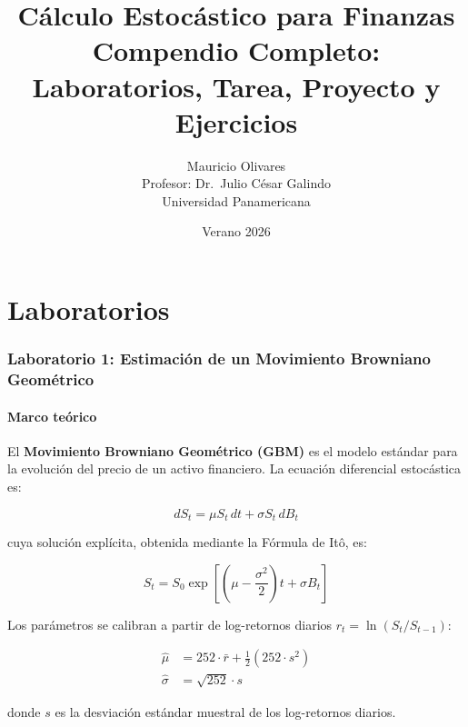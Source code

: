 \documentclass[12pt,letterpaper]{article}
\title{
  \LARGE\bfseries C\'alculo Estoc\'astico para Finanzas\\[0.5em]
  \large Compendio Completo: Laboratorios, Tarea, Proyecto y Ejercicios
}
\author{
  Mauricio Olivares\\[0.3em]
  \small Profesor: Dr.\ Julio C\'esar Galindo\\
  \small Universidad Panamericana
}
\date{Verano 2026}
\begin{document}

\maketitle
\thispagestyle{empty}

\tableofcontents
\newpage

\part{Laboratorios}

\section{Laboratorio 1: Estimaci\'on de un Movimiento Browniano Geom\'etrico}

\subsection{Marco te\'orico}

El \textbf{Movimiento Browniano Geom\'etrico (GBM)} es el modelo est\'andar para la
evoluci\'on del precio de un activo financiero. La ecuaci\'on diferencial estoc\'astica es:

\begin{equation}
  dS_t = \mu S_t \, dt + \sigma S_t \, dB_t
\end{equation}

cuya soluci\'on expl\'icita, obtenida mediante la F\'ormula de It\^o, es:

\begin{equation}
  S_t = S_0 \exp\!\left[\left(\mu - \frac{\sigma^2}{2}\right)t + \sigma B_t\right]
\end{equation}

Los par\'ametros se calibran a partir de log-retornos diarios
$r_t = \ln(S_t / S_{t-1})$:

\begin{align}
  \hat{\mu}    &= 252 \cdot \bar{r} + \tfrac{1}{2}(252 \cdot s^2) \\
  \hat{\sigma} &= \sqrt{252} \cdot s
\end{align}

donde $s$ es la desviaci\'on est\'andar muestral de los log-retornos diarios.
\end{document}
